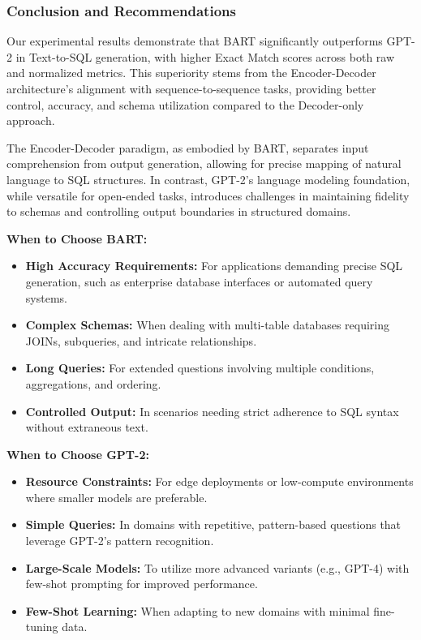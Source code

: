 \subsubsection{Conclusion and Recommendations}
Our experimental results demonstrate that BART significantly outperforms GPT-2 in Text-to-SQL generation, with higher Exact Match scores across both raw and normalized metrics. This superiority stems from the Encoder-Decoder architecture's alignment with sequence-to-sequence tasks, providing better control, accuracy, and schema utilization compared to the Decoder-only approach.

The Encoder-Decoder paradigm, as embodied by BART, separates input comprehension from output generation, allowing for precise mapping of natural language to SQL structures. In contrast, GPT-2's language modeling foundation, while versatile for open-ended tasks, introduces challenges in maintaining fidelity to schemas and controlling output boundaries in structured domains.

\textbf{When to Choose BART:}
\begin{itemize}
    \item \textbf{High Accuracy Requirements:} For applications demanding precise SQL generation, such as enterprise database interfaces or automated query systems.
    \item \textbf{Complex Schemas:} When dealing with multi-table databases requiring JOINs, subqueries, and intricate relationships.
    \item \textbf{Long Queries:} For extended questions involving multiple conditions, aggregations, and ordering.
    \item \textbf{Controlled Output:} In scenarios needing strict adherence to SQL syntax without extraneous text.
\end{itemize}

\textbf{When to Choose GPT-2:}
\begin{itemize}
    \item \textbf{Resource Constraints:} For edge deployments or low-compute environments where smaller models are preferable.
    \item \textbf{Simple Queries:} In domains with repetitive, pattern-based questions that leverage GPT-2's pattern recognition.
    \item \textbf{Large-Scale Models:} To utilize more advanced variants (e.g., GPT-4) with few-shot prompting for improved performance.
    \item \textbf{Few-Shot Learning:} When adapting to new domains with minimal fine-tuning data.
\end{itemize}

